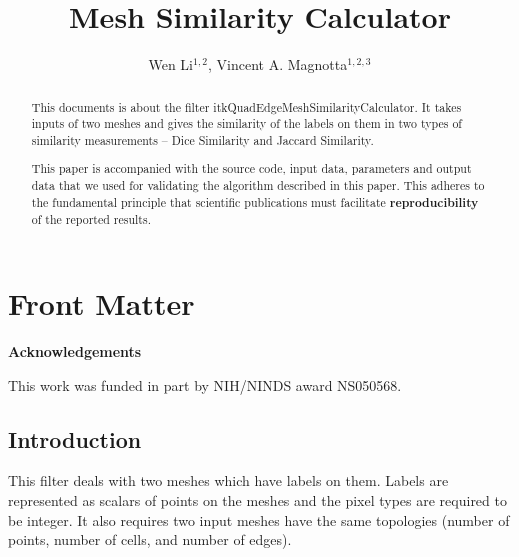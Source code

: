 \documentclass{InsightArticle}
\title{Mesh Similarity Calculator}
\author{Wen Li$^{1,2}$, Vincent A. Magnotta$^{1,2,3}$}
\makeatletter
\newcommand\ackname{Acknowledgements}
\newenvironment{acknowledgements}{%
      \titlepage
      \null\vfil
      \@beginparpenalty\@lowpenalty
      \begin{center}%
        \bfseries \ackname
        \@endparpenalty\@M
      \end{center}}%
     {\par\vfil\null\endtitlepage}
\newenvironment{acknowledgements}{%
      \if@twocolumn
        \section*{\abstractname}%
      \else
        \small
        \begin{center}%
          {\bfseries \ackname\vspace{-.5em}\vspace{\z@}}%
        \end{center}%
        \quotation
      \fi}
      {\if@twocolumn\else\endquotation\fi}
\newcommand{\IJhandlerIDnumber}{3202}
\makeatother
\begin{document}
%
% 
\IJhandlefooter{\IJhandlerIDnumber}


\ifpdf
\else
\fi


\maketitle


\ifhtml
\chapter*{Front Matter\label{front}}
\fi


\begin{abstract}
 
This documents is about the filter itkQuadEdgeMeshSimilarityCalculator. It takes 
inputs of two meshes and gives the similarity of the labels on them in two types of
similarity measurements -- Dice Similarity and Jaccard Similarity.

This paper is accompanied with the source code, input data, parameters and
output data that we used for validating the algorithm described in this paper.
This adheres to the fundamental principle that scientific publications must
facilitate \textbf{reproducibility} of the reported results.
\end{abstract}

\begin{acknowledgements}
This work was funded in part by NIH/NINDS award NS050568.
\end{acknowledgements}

\tableofcontents

\section{Introduction}
This filter deals with two meshes which have labels on them. Labels are represented as 
scalars of points on the meshes and the pixel types are required to be integer. It also 
requires two input meshes have the same topologies (number of points, number of cells,
and number of edges). 
\end{document}
